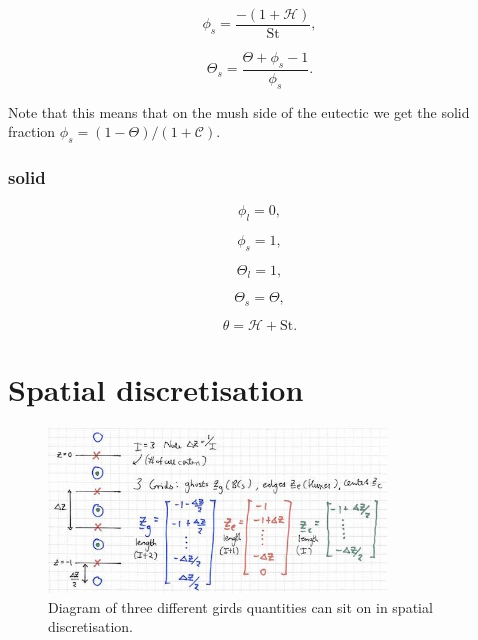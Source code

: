 \documentclass[a4paper,11pt]{article}
\numberwithin{equation}{section}
\begin{document}
\begin{equation*}
\phi_s = \frac{-(1 + \mathcal{H})}{\text{St}},
\end{equation*}

\begin{equation*}
\Theta_s = \frac{\Theta + \phi_s -1}{\phi_s}.
\end{equation*}

Note that this means that on the mush side of the eutectic we get the solid fraction $\phi_s = (1-\Theta) / (1 + \mathcal{C})$.

\subsubsection{solid} \label{ssub:solid}

\begin{equation*}
\phi_l = 0, 
\end{equation*}

\begin{equation*}
\phi_s = 1,
\end{equation*}

\begin{equation*}
\Theta_l = 1,
\end{equation*}

\begin{equation*}
\Theta_s = \Theta,
\end{equation*}

\begin{equation*}
\theta = \mathcal{H} + \text{St}.
\end{equation*}

\section{Spatial discretisation}\label{sec:Spatial-discretisation}

\begin{figure}[h]
  \centering
  \includegraphics[width=0.8\textwidth]{spatial_discretisation}
  \caption{Diagram of three different girds quantities can sit on in spatial discretisation.}
  \label{fig:spatial_discretisation}
\end{figure}
\end{document}
